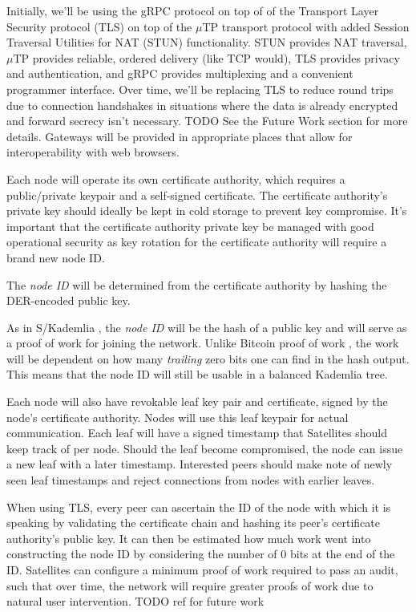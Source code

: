 \documentclass[a4paper,10pt]{article} \usepackage[utf8]{inputenc}
\newcommand{\todo}[1]{{\color{red} TODO #1 }}
\begin{document}
Initially, we'll be using the gRPC \cite{grpc} protocol on top of of the
Transport Layer Security protocol (TLS) on top of the $\mu$TP
\cite{utp} transport protocol with added Session Traversal Utilities for NAT
(STUN) functionality. STUN provides NAT traversal, $\mu$TP provides reliable,
ordered delivery (like TCP would), TLS provides privacy and authentication,
and gRPC provides multiplexing and a convenient programmer interface.
Over time, we'll be replacing TLS to
reduce round trips due to connection handshakes in situations where the data is
already encrypted and forward secrecy isn't necessary. \todo{} See the Future
Work section for more details. Gateways will be provided in appropriate places
that allow for interoperability with web browsers.

Each node will operate its own certificate authority, which requires a
public/private keypair and a self-signed certificate. The certificate
authority's private key should ideally be kept in cold storage to prevent key
compromise.
It's important that the certificate authority private key be managed with good
operational security as key rotation for the certificate authority will require
a brand new node ID.

The {\em node ID} will be determined from the certificate authority
by hashing the DER-encoded public key.

As in S/Kademlia \cite{skad}, the {\em node ID} will be the hash of a public key
and will serve as a proof of work for joining the network. Unlike Bitcoin proof
of work \cite{bitcoin}, the work will be dependent on how many {\em trailing}
zero bits one can find in the hash output. This means that the node ID will
still be usable in a balanced Kademlia \cite{kad} tree.

Each node will also have revokable leaf key pair and certificate, signed by
the node's certificate authority. Nodes will use this leaf keypair for actual
communication. Each leaf will have a signed timestamp that Satellites should
keep track of per node. Should the leaf become compromised, the node can issue
a new leaf with a later timestamp. Interested peers should make note of newly
seen leaf timestamps and reject connections from nodes with earlier leaves.

When using TLS, every peer can ascertain the ID of the node with which it is
speaking by validating the certificate chain and hashing its peer's
certificate authority's public key. It can then be estimated how much work went
into constructing the node ID by considering the number of 0 bits at the end of
the ID. Satellites can configure a minimum proof of work required to pass an
audit, such that over time, the network will require greater proofs of work
due to natural user intervention. \todo{ref for future work}
\end{document}

